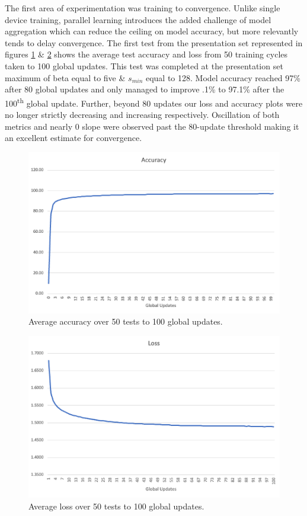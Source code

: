 \documentclass[../mthe-493-final-project.tex]{subfiles}
\begin{document}
    The first area of experimentation was training to convergence. Unlike single device training, parallel learning introduces the added challenge of model aggregation which can reduce the ceiling on model accuracy, but more relevantly tends to delay convergence. The first test from the presentation set represented in figures \ref{fig:res_1} \& \ref{fig:res_2} shows the average test accuracy and loss from 50 training cycles taken to 100 global updates. This test was completed at the presentation set maximum of beta equal to five \& $s_{min}$ equal to 128. Model accuracy reached 97\% after 80 global updates and only managed to improve .1\% to 97.1\% after the 100\textsuperscript{th} global update. Further, beyond 80 updates our loss and accuracy plots were no longer strictly decreasing and increasing respectively. Oscillation of both metrics and nearly 0 slope were observed past the 80-update threshold making it an excellent estimate for convergence.
    \begin{figure}
        \centering
        \includegraphics[width=150mm]{thesis/img/res_1.png}
        \caption{Average accuracy over 50 tests to 100 global updates.}
        \label{fig:res_1}
    \end{figure}
    \begin{figure}
        \centering
        \includegraphics[width=150mm]{thesis/img/res_2.png}
        \caption{Average loss over 50 tests to 100 global updates.}
        \label{fig:res_2}
    \end{figure}
\end{document}

